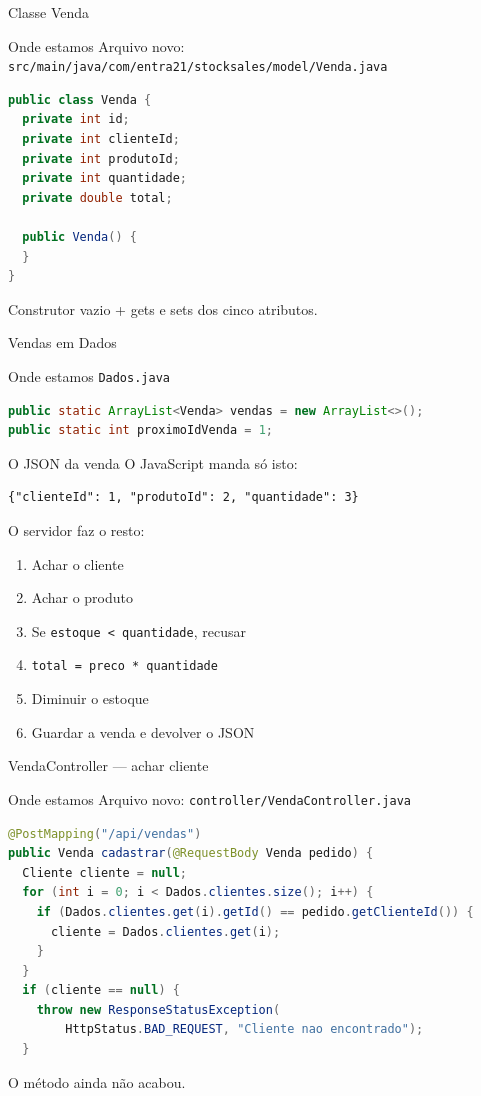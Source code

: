 \documentclass[aspectratio=169,11pt]{beamer}
\newcommand{\onde}[1]{%
  \begin{block}{Onde estamos}
    #1
  \end{block}
}
\begin{document}
\begin{frame}[fragile]{Classe Venda}
  \onde{Arquivo novo:\\
        \texttt{src/main/java/com/entra21/stocksales/model/Venda.java}}

\begin{lstlisting}[language=Java,basicstyle=\ttfamily\footnotesize]
public class Venda {
  private int id;
  private int clienteId;
  private int produtoId;
  private int quantidade;
  private double total;

  public Venda() {
  }
}
\end{lstlisting}

  Construtor vazio + gets e sets dos cinco atributos.
\end{frame}

\begin{frame}[fragile]{Vendas em Dados}
  \onde{\texttt{Dados.java}}

\begin{lstlisting}[language=Java,basicstyle=\ttfamily\footnotesize]
public static ArrayList<Venda> vendas = new ArrayList<>();
public static int proximoIdVenda = 1;
\end{lstlisting}
\end{frame}

\begin{frame}[fragile]{O JSON da venda}
  O JavaScript manda só isto:

\begin{lstlisting}[basicstyle=\ttfamily\footnotesize]
{"clienteId": 1, "produtoId": 2, "quantidade": 3}
\end{lstlisting}

  \vspace{0.4em}
  O servidor faz o resto:
  \begin{enumerate}
    \item Achar o cliente
    \item Achar o produto
    \item Se \texttt{estoque < quantidade}, recusar
    \item \texttt{total = preco * quantidade}
    \item Diminuir o estoque
    \item Guardar a venda e devolver o JSON
  \end{enumerate}
\end{frame}

\begin{frame}[fragile]{VendaController --- achar cliente}
  \onde{Arquivo novo: \texttt{controller/VendaController.java}}

\begin{lstlisting}[language=Java,basicstyle=\ttfamily\scriptsize]
@PostMapping("/api/vendas")
public Venda cadastrar(@RequestBody Venda pedido) {
  Cliente cliente = null;
  for (int i = 0; i < Dados.clientes.size(); i++) {
    if (Dados.clientes.get(i).getId() == pedido.getClienteId()) {
      cliente = Dados.clientes.get(i);
    }
  }
  if (cliente == null) {
    throw new ResponseStatusException(
        HttpStatus.BAD_REQUEST, "Cliente nao encontrado");
  }
\end{lstlisting}

  O método ainda não acabou.
\end{frame}
\end{document}
